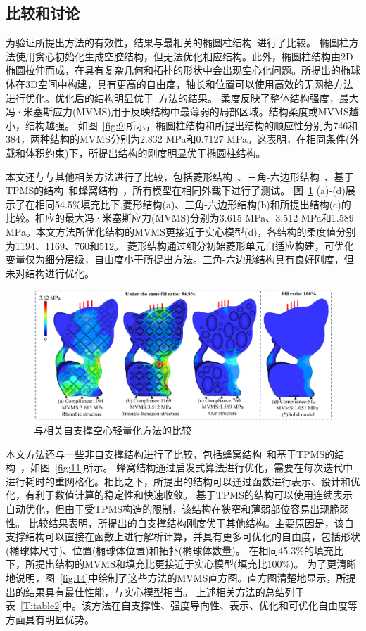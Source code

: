 \subsection{比较和讨论}
为验证所提出方法的有效性，结果与最相关的椭圆柱结构~\cite{lee2018support}进行了比较。
椭圆柱方法使用贪心初始化生成空腔结构，但无法优化相应结构。此外，椭圆柱结构由2D椭圆拉伸而成，在具有复杂几何和拓扑的形状中会出现空心化问题。所提出的椭球体在3D空间中构建，具有更高的自由度，轴长和位置可以使用高效的无网格方法进行优化。优化后的结构明显优于~\cite{lee2018support}方法的结果。
柔度反映了整体结构强度，最大冯·米塞斯应力(MVMS)用于反映结构中最薄弱的局部区域。结构柔度或MVMS越小，结构越强。
如图~\ref{fig:9}所示，椭圆柱结构和所提出结构的顺应性分别为746和384，两种结构的MVMS分别为2.832 MPa和0.7127 MPa。这表明，在相同条件(外载和体积约束)下，所提出结构的刚度明显优于椭圆柱结构。

本文还与与其他相关方法进行了比较，包括菱形结构~\cite{wu2016self}、三角-六边形结构~\cite{xu2021support}、基于TPMS的结构~\cite{hu2020efficient}和蜂窝结构~\cite{10.1145/2601097.2601168}，所有模型在相同外载下进行了测试。
图~\ref{fig:10} (a)-(d)展示了在相同54.5\%填充比下,菱形结构(a)、三角-六边形结构(b)和所提出结构(c)的比较。相应的最大冯·米塞斯应力(MVMS)分别为3.615 MPa、3.512 MPa和1.589 MPa。本文方法所优化结构的MVMS更接近于实心模型(d)，各结构的柔度值分别为1194、1169、760和512。
菱形结构通过细分初始菱形单元自适应构建，可优化变量仅为细分层级，自由度小于所提出方法。三角-六边形结构具有良好刚度，但未对结构进行优化。
\begin{figure}[htbp]
    \begin {center}
    \includegraphics[width=0.8 \textwidth]{./figures/self-support/fig11.png}
    \caption{与相关自支撑空心轻量化方法的比较~\cite{wu2016self,xu2021support}}
    \label{fig:10}
    \end {center}
\end{figure}

本文方法还与一些非自支撑结构进行了比较，包括蜂窝结构~\cite{10.1145/2601097.2601168}和基于TPMS的结构~\cite{hu2020efficient}，如图~\ref{fig:11}所示。
蜂窝结构通过启发式算法进行优化，需要在每次迭代中进行耗时的重网格化。相比之下，所提出的结构可以通过函数进行表示、设计和优化，有利于数值计算的稳定性和快速收敛。
基于TPMS的结构可以使用连续表示自动优化，但由于受TPMS构造的限制，该结构在狭窄和薄弱部位容易出现脆弱性。
比较结果表明，所提出的自支撑结构刚度优于其他结构。主要原因是，该自支撑结构可以直接在函数上进行解析计算，并具有更多可优化的自由度，包括形状(椭球体尺寸)、位置(椭球体位置)和拓扑(椭球体数量)。
在相同45.3\%的填充比下，所提出结构的MVMS和填充比更接近于实心模型(填充比100\%)。
为了更清晰地说明，图~\ref{fig:14}中绘制了这些方法的MVMS直方图。直方图清楚地显示，所提出的结果具有最佳性能，与实心模型相当。
上述相关方法的总结列于表~\ref{T:table2}中。该方法在自支撑性、强度导向性、表示、优化和可优化自由度等方面具有明显优势。

